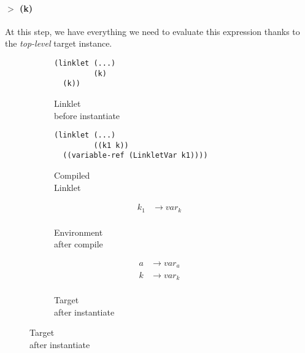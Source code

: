 \paragraph{$>$ (k)}

At this step, we have everything we need to evaluate this expression
thanks to the \emph{top-level} target instance.

\begin{figure}[h!]
  \small
  \begin{subfigure}[b]{0.25\textwidth}
    \begin{mdframed}
\begin{verbatim}
(linklet (...)
         (k)
  (k))
\end{verbatim}
    \end{mdframed}
    \caption{Linklet \\ before instantiate}
    \label{fig:1}
  \end{subfigure}
  \begin{subfigure}[b]{0.38\textwidth}
    \begin{mdframed}
\begin{verbatim}
(linklet (...)
         ((k1 k))
  ((variable-ref (LinkletVar k1))))
\end{verbatim}
    \end{mdframed}
    \caption{Compiled \\ Linklet}
    \label{fig:2}
  \end{subfigure} \hfill
  \begin{subfigure}[b]{0.15\textwidth}
    \begin{mdframed}
      \begin{align*}
        k_1 &\rightarrow var_k \\
      \end{align*}
    \end{mdframed}
    \caption{Environment \\ after compile}
    \label{fig:2}
  \end{subfigure}
  \begin{subfigure}[b]{0.15\textwidth}
    \begin{mdframed}
      \begin{align*}
        a &\rightarrow var_a \\
        k &\rightarrow var_k \\
      \end{align*}
    \end{mdframed}
    \caption{Target \\ after instantiate}
    \label{fig:2}
  \end{subfigure}
\end{figure}
